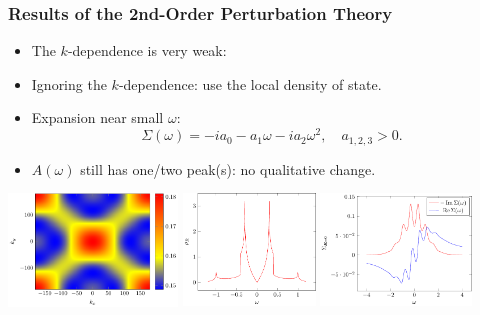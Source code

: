 \documentclass[xcolor=table, 10pt, aspectratio=169]{beamer}
\begin{document}
\begin{frame}
\frametitle{Results of the 2nd-Order Perturbation Theory}
\begin{itemize}
\item The $k$-dependence is very weak:
\item Ignoring the $k$-dependence: use the local density of state.
\item Expansion near small $\omega$:
\[\Sigma(\omega) = -ia_0-a_1\omega-ia_2\omega^2,\quad
a_{1,2,3}>0.\]
\item $A(\omega)$ still has one/two peak(s): no qualitative change.
\end{itemize}
\begin{center}
\includegraphics[height=3cm]{gammak_v1}
\includegraphics[height=3cm]{rho_dwave0}
\includegraphics[height=3cm]{ims_dwave}
\end{center}
\end{frame}
\end{document}
